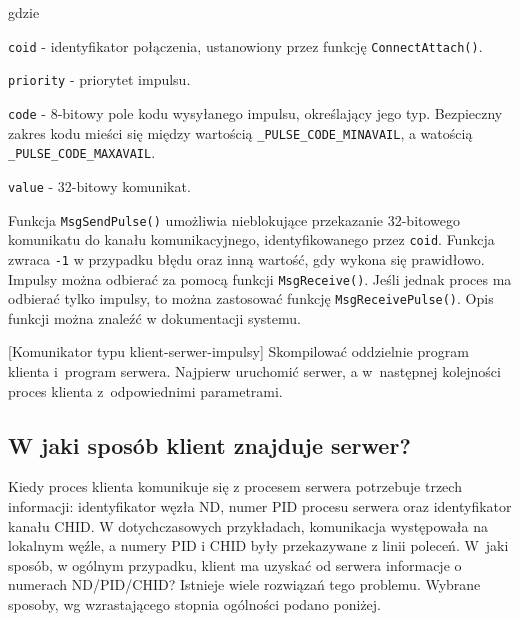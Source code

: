 gdzie

\begin{myitemize}
\item[] \lstinline[style=MyCStyle]{coid} - identyfikator połączenia, ustanowiony przez funkcję \lstinline[style=MyCStyle]{ConnectAttach()}.
\item[] \lstinline[style=MyCStyle]{priority} - priorytet impulsu. 
\item[] \lstinline[style=MyCStyle]{code} - 8-bitowy pole kodu wysyłanego impulsu, określający jego typ. Bezpieczny zakres kodu mieści się między wartością \lstinline[style=MyCStyle]{_PULSE_CODE_MINAVAIL},  a watością  \lstinline[style=MyCStyle]{_PULSE_CODE_MAXAVAIL}.
\item[] \lstinline[style=MyCStyle]{value} - 32-bitowy komunikat.
\end{myitemize}


Funkcja \lstinline[style=MyCStyle]{MsgSendPulse()} umożliwia nieblokujące przekazanie 32-bitowego komunikatu do kanału komunikacyjnego, identyfikowanego przez \lstinline[style=MyCStyle]{coid}. Funkcja zwraca \lstinline[style=MyCStyle]{-1} w przypadku błędu oraz inną wartość, gdy wykona się prawidłowo. Impulsy można odbierać za pomocą funkcji \lstinline[style=MyCStyle]{MsgReceive()}. Jeśli jednak proces ma odbierać tylko impulsy, to można zastosować funkcję \lstinline[style=MyCStyle]{MsgReceivePulse()}.  Opis funkcji można znaleźć w dokumentacji systemu. 

\begin{example}{[Komunikator typu klient-serwer-impulsy]} Skompilować oddzielnie program klienta i~program serwera. Najpierw uruchomić serwer, a w~następnej kolejności proces klienta z~odpowiednimi parametrami. 


\end{example} 


\subsection{W jaki sposób klient znajduje serwer?}

Kiedy proces klienta komunikuje się z procesem serwera potrzebuje trzech informacji: identyfikator węzła ND, numer PID procesu serwera oraz identyfikator kanału CHID. W dotychczasowych przykładach, komunikacja występowała na lokalnym węźle, a numery PID i CHID były przekazywane z linii poleceń. W~jaki sposób, w ogólnym przypadku, klient ma uzyskać od serwera informacje o numerach ND/PID/CHID? Istnieje wiele rozwiązań tego problemu. Wybrane sposoby, wg wzrastającego stopnia ogólności podano poniżej.

